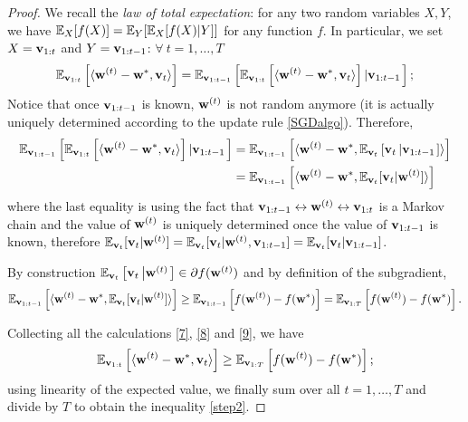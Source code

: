 \documentclass{article}
\begin{document}
\begin{proof}
 We recall the \textit{law of total expectation}: for any two random variables $X,Y$, we have $\mathbb{E}_X[f(X)] = \mathbb{E}_Y[\mathbb{E}_X[f(X)|Y]]$ for any function $f$. In particular, we set $X = {\bf v}_{1:t}$ and $Y = {\bf v}_{1:t-1}$: $\forall \ t = 1,\ldots, T$
\begin{gather}
 \mathbb{E}_{{\bf v}_{1:t}} \left[ \langle {\bf w}^{(t)} - {\bf w}^\ast, {\bf v}_t\rangle \right]  
 =  \mathbb{E}_{{\bf v}_{1:t-1}} \left[ \mathbb{E}_{{\bf v}_{1:t}} \left[ \langle {\bf w}^{(t)} - {\bf w}^\ast, {\bf v}_t\rangle \right] \left| {\bf v}_{1:t-1}  \right.\right]; \label{7}
\end{gather}
Notice that once ${\bf v}_{1:t-1}$ is known, ${\bf w}^{(t)}$ is not random anymore (it is actually uniquely determined according to the update rule \ref{SGDalgo}). Therefore,
\begin{align}
 \mathbb{E}_{{\bf v}_{1:t-1}} \left[ \mathbb{E}_{{\bf v}_{1:t}} \left[ \langle {\bf w}^{(t)} - {\bf w}^\ast, {\bf v}_t\rangle \right] \left| {\bf v}_{1:t-1}  \right.\right] &= 
  \mathbb{E}_{{\bf v}_{1:t-1}} \left[  \langle {\bf w}^{(t)} - {\bf w}^\ast, \mathbb{E}_{{\bf v}_{t}} \left[ {\bf v}_t \left| {\bf v}_{1:t-1}  \right.\right]  \rangle \right] \nonumber \\
  &=   \mathbb{E}_{{\bf v}_{1:t-1}} \left[  \langle {\bf w}^{(t)} - {\bf w}^\ast, \mathbb{E}_{{\bf v}_{t}} [ {\bf v}_t | {\bf w}^{(t)}  ]  \rangle \right] \label{8}
\end{align}
where the last equality is using the fact that ${\bf v}_{1:t-1} \leftrightarrow  {\bf w}^{(t)} \leftrightarrow {\bf v}_{1:t}$ is a Markov chain and the value of ${\bf w}^{(t)}$ is uniquely determined once the value of ${\bf v}_{1:t-1}$ is known, therefore $ \mathbb{E}_{{\bf v}_{t}} [ {\bf v}_t | {\bf w}^{(t)}  ]  =  \mathbb{E}_{{\bf v}_{t}} [ {\bf v}_t | {\bf w}^{(t)}, {\bf v}_{1:t-1}  ]  = \mathbb{E}_{{\bf v}_{t}} [ {\bf v}_t | {\bf v}_{1:t-1}  ] $.


By construction $ \mathbb{E}_{{\bf v}_{t}} \left[ {\bf v}_t \left| {\bf w}^{(t)}  \right.\right] \in \partial f({\bf w}^{(t)})$ and by definition of the subgradient, 
\begin{gather}
 \mathbb{E}_{{\bf v}_{1:t-1}} \left[  \langle {\bf w}^{(t)} - {\bf w}^\ast, \mathbb{E}_{{\bf v}_{t}} [ {\bf v}_t | {\bf w}^{(t)}  ]  \rangle \right] \geq  \mathbb{E}_{{\bf v}_{1:t-1}} \left[ f({\bf w}^{(t)}) - f({\bf w}^\ast)  \right] = \mathbb{E}_{{\bf v}_{1:T}} \left[ f({\bf w}^{(t)}) - f({\bf w}^\ast)  \right]. \label{9}
\end{gather}

Collecting all the calculations \eqref{7}, \eqref{8} and \eqref{9}, we have
\begin{gather}
 \mathbb{E}_{{\bf v}_{1:t}} \left[ \langle {\bf w}^{(t)} - {\bf w}^\ast, {\bf v}_t\rangle \right]   \geq  \mathbb{E}_{{\bf v}_{1:T}} \left[ f({\bf w}^{(t)}) - f({\bf w}^\ast)  \right] ;
\end{gather}
using linearity of the expected value, we finally sum over all $t=1,\ldots, T$ and divide by $T$ to obtain the inequality \eqref{step2}.



\end{proof}
\end{document}
